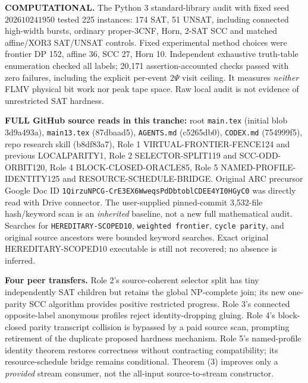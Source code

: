 \documentclass[11pt]{article}
\begin{document}
\noindent\textbf{COMPUTATIONAL.} The Python 3 standard-library audit with fixed seed \(202610241950\) tested 225 instances: 174 SAT, 51 UNSAT, including connected high-width bursts, ordinary proper-3CNF, Horn, 2-SAT SCC and matched affine/XOR3 SAT/UNSAT controls. Fixed experimental method choices were frontier DP 152, affine 36, SCC 27, Horn 10. Independent exhaustive truth-table enumeration checked all labels; 20,171 assertion-accounted checks passed with zero failures, including the explicit per-event \(2\Psi\) visit ceiling. It measures \emph{neither} FLMV physical bit work nor peak tape space. Raw local audit is not evidence of unrestricted SAT hardness.

\noindent\textbf{FULL GitHub source reads in this tranche:} root \texttt{main.tex} (initial blob 3d9a493a), \texttt{main13.tex} (87dbaad5), \texttt{AGENTS.md} (c5265db0), \texttt{CODEX.md} (754999f5), repo research skill (b8df83a7), Role 1 VIRTUAL-FRONTIER-FENCE124 and previous LOCALPARITY1, Role 2 SELECTOR-SPLIT119 and SCC-ODD-ORBIT120, Role 4 BLOCK-CLOSED-ORACLE85, Role 5 NAMED-PROFILE-IDENTITY125 and RESOURCE-SCHEDULE-BRIDGE. Original ARC precursor Google Doc ID \texttt{1QirzuNPCG-CrE3EX6WweqsPdDbtoblCDEE4YI0HGyC0} was directly read with Drive connector. The user-supplied pinned-commit 3,532-file hash/keyword scan is an \emph{inherited} baseline, not a new full mathematical audit. Searches for \texttt{HEREDITARY-SCOPED10}, \texttt{weighted frontier}, \texttt{cycle parity}, and original source ancestors were bounded keyword searches. Exact original HEREDITARY-SCOPED10 executable is still not recovered; no absence is inferred.

\noindent\textbf{Four peer transfers.} Role 2's source-coherent selector split has tiny independently SAT children but retains the global NP-complete join; its new one-parity SCC algorithm provides positive restricted progress. Role 3's connected opposite-label anonymous profiles reject identity-dropping gluing. Role 4's block-closed parity transcript collision is bypassed by a paid source scan, prompting retirement of the duplicate proposed hardness mechanism. Role 5's named-profile identity theorem restores correctness without contracting compatibility; its resource-schedule bridge remains conditional. Theorem (3) improves only a \emph{provided} stream consumer, not the all-input source-to-stream constructor.
\end{document}
